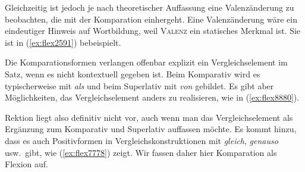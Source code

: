 Gleichzeitig ist jedoch je nach theoretischer Auffassung eine Valenzänderung zu beobachten, die mit der Komparation einhergeht.
Eine Valenzänderung wäre ein eindeutiger Hinweis auf Wortbildung, weil \textsc{Valenz} ein statisches Merkmal ist.
Sie ist in (\ref{ex:flex2591}) bebeispielt.

\begin{exe}
  \ex \label{ex:flex2591}
  \begin{xlist}
  \end{xlist}
\end{exe}


Die Komparationsformen verlangen offenbar explizit ein Vergleichselement im Satz, wenn es nicht kontextuell gegeben ist.
Beim Komparativ wird es typischerweise mit \textit{als} und beim Superlativ mit \textit{von} gebildet.
Es gibt aber Möglichkeiten, das Vergleichselement anders zu realisieren, wie \zB in (\ref{ex:flex8880}).

\begin{exe}
  \ex \label{ex:flex8880}
  \begin{xlist}
  \end{xlist}
\end{exe}

Rektion liegt also definitiv nicht vor, auch wenn man das Vergleichselement als Ergänzung zum Komparativ und Superlativ auffassen möchte.
Es kommt hinzu, dass es auch Positivformen in Vergleichskonstruktionen mit \textit{gleich}, \textit{genauso} usw.\ gibt, wie (\ref{ex:flex7778}) zeigt.
Wir fassen daher hier Komparation als Flexion auf.

\begin{exe}
  \ex\label{ex:flex7778}
  \begin{xlist}
  \end{xlist}
\end{exe}




